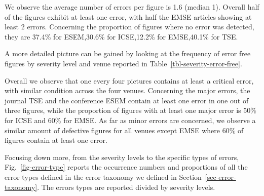 \documentclass[
  10pt,
  conference,
]{IEEEtran}%
\begin{document}
We observe the average number of errors per figure is 1.6 (median 1).
Overall half of the figures exhibit at least one error, with half the
EMSE articles showing at least 2 errors. Concerning the proportion of
figures where no error was detected, they are 37.4\% for ESEM,30.6\% for
ICSE,12.2\% for EMSE,40.1\% for TSE.

A more detailed picture can be gained by looking at the frequency of
error free figures by severity level and venue reported in
Table~\ref{tbl-severity-error-free}.

\begin{table}

\caption{\label{tbl-severity-error-free}Proportion of error free figures
per severity and venue}


\end{table}%

Overall we observe that one every four pictures contains at least a
critical error, with similar condition across the four venues.
Concerning the major errors, the journal TSE and the conference ESEM
contain at least one error in one out of three figures, while the
proportion of figures with at least one major error is 50\% for ICSE and
60\% for EMSE. As far as minor errors are concerned, we observe a
similar amount of defective figures for all venues except EMSE where
60\% of figures contain at least one error.

Focusing down more, from the severity levels to the specific types of
errors, Fig.~\ref{fig-error-type} reports the occurrence numbers and
proportions of all the error types defined in the error taxonomy we
defined in Section~\ref{sec-error-taxonomy}. The errors types are
reported divided by severity levels.
\end{document}
